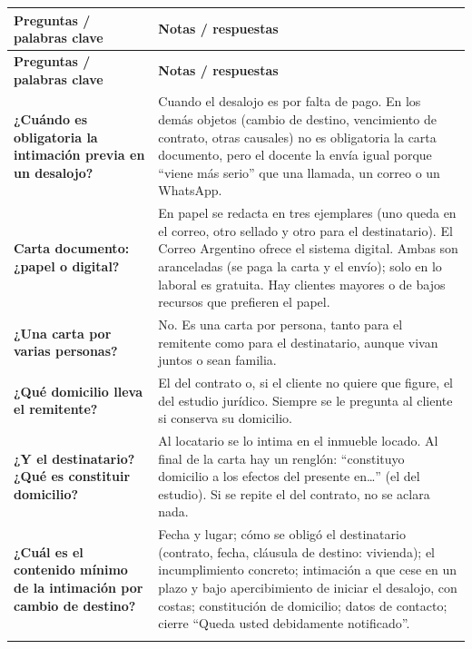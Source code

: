 \documentclass[12pt,oneside]{book}
\begin{document}
\begin{longtable}{>{\RaggedRight\arraybackslash}p{} >{\RaggedRight\arraybackslash}p{}}
\toprule
\textbf{Preguntas / palabras clave} & \textbf{Notas / respuestas} \\
\midrule
\endfirsthead
\toprule
\textbf{Preguntas / palabras clave} & \textbf{Notas / respuestas} \\
\midrule
\endhead

\textbf{¿Cuándo es obligatoria la intimación previa en un desalojo?} &
Cuando el desalojo es por falta de pago. En los demás objetos (cambio de destino, vencimiento de contrato, otras causales) no es obligatoria la carta documento, pero el docente la envía igual porque ``viene más serio'' que una llamada, un correo o un WhatsApp. \\
\addlinespace \cmidrule{1-2}

\textbf{Carta documento: ¿papel o digital?} &
En papel se redacta en tres ejemplares (uno queda en el correo, otro sellado y otro para el destinatario). El Correo Argentino ofrece el sistema digital. Ambas son aranceladas (se paga la carta y el envío); solo en lo laboral es gratuita. Hay clientes mayores o de bajos recursos que prefieren el papel. \\
\addlinespace \cmidrule{1-2}

\textbf{¿Una carta por varias personas?} &
No. Es una carta por persona, tanto para el remitente como para el destinatario, aunque vivan juntos o sean familia. \\
\addlinespace \cmidrule{1-2}

\textbf{¿Qué domicilio lleva el remitente?} &
El del contrato o, si el cliente no quiere que figure, el del estudio jurídico. Siempre se le pregunta al cliente si conserva su domicilio. \\
\addlinespace \cmidrule{1-2}

\textbf{¿Y el destinatario? ¿Qué es constituir domicilio?} &
Al locatario se lo intima en el inmueble locado. Al final de la carta hay un renglón: ``constituyo domicilio a los efectos del presente en…'' (el del estudio). Si se repite el del contrato, no se aclara nada. \\
\addlinespace \cmidrule{1-2}

\textbf{¿Cuál es el contenido mínimo de la intimación por cambio de destino?} &
Fecha y lugar; cómo se obligó el destinatario (contrato, fecha, cláusula de destino: vivienda); el incumplimiento concreto; intimación a que cese en un plazo y bajo apercibimiento de iniciar el desalojo, con costas; constitución de domicilio; datos de contacto; cierre ``Queda usted debidamente notificado''. \\
\addlinespace \cmidrule{1-2}


\end{longtable}
\end{document}
